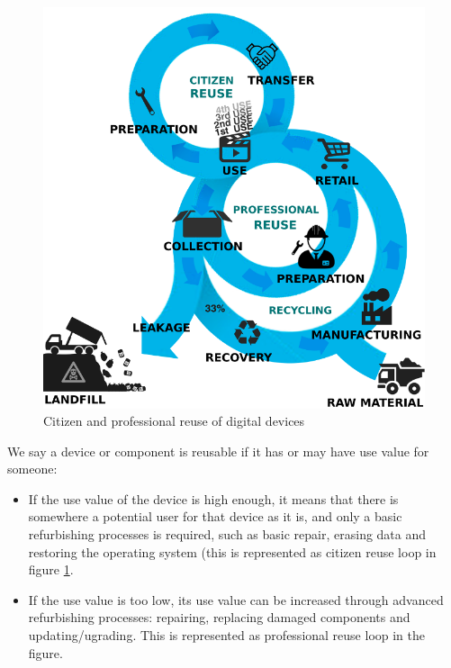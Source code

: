 \documentclass[
]{book}
\begin{document}
\begin{figure}

{\centering \includegraphics[width=1\linewidth]{./figs/27} 

}

\caption{Citizen and professional reuse of digital devices}\label{fig:figreuseelectronics}
\end{figure}

We say a device or component is reusable if it has or may have use value for someone:

\begin{itemize}
\item
  If the use value of the device is high enough, it means that there is somewhere a potential user for that device as it is, and only a basic refurbishing processes is required, such as basic repair, erasing data and restoring the operating system (this is represented as citizen reuse loop in figure \ref{fig:figreuseelectronics}.
\item
  If the use value is too low, its use value can be increased through advanced refurbishing processes: repairing, replacing damaged components and updating/ugrading. This is represented as professional reuse loop in the figure.
\end{itemize}
\end{document}
